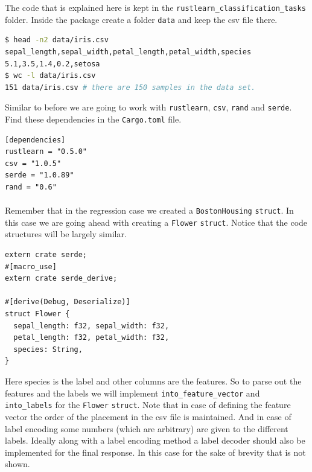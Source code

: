 \documentclass{book}
\begin{document}
The code that is explained here is kept in the \lstinline{rustlearn_classification_tasks} folder. Inside the package create a folder \lstinline{data} and keep the csv file there.
\label{par:}

\begin{lstlisting}[language=bash,caption={iris data}]
$ head -n2 data/iris.csv
sepal_length,sepal_width,petal_length,petal_width,species
5.1,3.5,1.4,0.2,setosa
$ wc -l data/iris.csv
151 data/iris.csv # there are 150 samples in the data set.
\end{lstlisting}

Similar to before we are going to work with \lstinline{rustlearn}, \lstinline{csv}, \lstinline{rand} and \lstinline{serde}. Find these dependencies in the \lstinline{Cargo.toml} file.

\begin{lstlisting}[caption={Cargo\\.toml}]
[dependencies]
rustlearn = "0.5.0"
csv = "1.0.5"
serde = "1.0.89"
rand = "0.6"
\end{lstlisting}

\paragraph{}%
Remember that in the regression case we created a \lstinline{BostonHousing} \lstinline{struct}. In this case we are going ahead with creating a \lstinline{Flower} \lstinline{struct}. Notice that the code structures will be largely similar.
\label{par:}

\begin{lstlisting}[caption={ml\\-utils\\/src\\/datasets\\.rs}]
extern crate serde;
#[macro_use]
extern crate serde_derive;

#[derive(Debug, Deserialize)]
struct Flower {
  sepal_length: f32, sepal_width: f32,
  petal_length: f32, petal_width: f32,
  species: String,
}
\end{lstlisting}

Here species is the label and other columns are the features. So to parse out the features and the labels we will implement \lstinline{into_feature_vector} and \lstinline{into_labels} for the \lstinline{Flower} \lstinline{struct}. Note that in case of defining the feature vector the order of the placement in the csv file is maintained. And in case of label encoding some numbers (which are arbitrary) are given to the different labels. Ideally along with a label encoding method a label decoder should also be implemented for the final response. In this case for the sake of brevity that is not shown.
\end{document}
